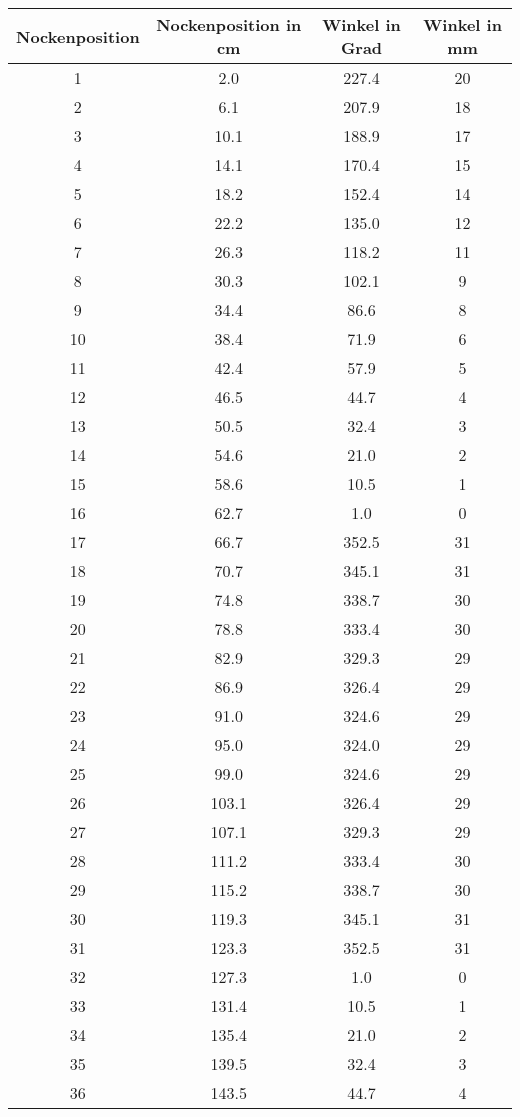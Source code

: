 \documentclass[10pt, a4paper]{article}
\begin{document}
\begin{center}
	\begin{tabular}{c|c|c|c}
		Nockenposition & Nockenposition in cm & Winkel in Grad & Winkel in mm \\
		\hline
		1 & 2.0 & 227.4 & 20 \\
		2 & 6.1 & 207.9 & 18 \\
		3 & 10.1 & 188.9 & 17 \\
		4 & 14.1 & 170.4 & 15 \\
		5 & 18.2 & 152.4 & 14 \\
		6 & 22.2 & 135.0 & 12 \\
		7 & 26.3 & 118.2 & 11 \\
		8 & 30.3 & 102.1 & 9 \\
		9 & 34.4 & 86.6 & 8 \\
		10 & 38.4 & 71.9 & 6 \\
		11 & 42.4 & 57.9 & 5 \\
		12 & 46.5 & 44.7 & 4 \\
		13 & 50.5 & 32.4 & 3 \\
		14 & 54.6 & 21.0 & 2 \\
		15 & 58.6 & 10.5 & 1 \\
		16 & 62.7 & 1.0 & 0 \\
		17 & 66.7 & 352.5 & 31 \\
		18 & 70.7 & 345.1 & 31 \\
		19 & 74.8 & 338.7 & 30 \\
		20 & 78.8 & 333.4 & 30 \\
		21 & 82.9 & 329.3 & 29 \\
		22 & 86.9 & 326.4 & 29 \\
		23 & 91.0 & 324.6 & 29 \\
		24 & 95.0 & 324.0 & 29 \\
		25 & 99.0 & 324.6 & 29 \\
		26 & 103.1 & 326.4 & 29 \\
		27 & 107.1 & 329.3 & 29 \\
		28 & 111.2 & 333.4 & 30 \\
		29 & 115.2 & 338.7 & 30 \\
		30 & 119.3 & 345.1 & 31 \\
		31 & 123.3 & 352.5 & 31 \\
		32 & 127.3 & 1.0 & 0 \\
		33 & 131.4 & 10.5 & 1 \\
		34 & 135.4 & 21.0 & 2 \\
		35 & 139.5 & 32.4 & 3 \\
		36 & 143.5 & 44.7 & 4 \\

\end{tabular}
\end{center}
\end{document}
